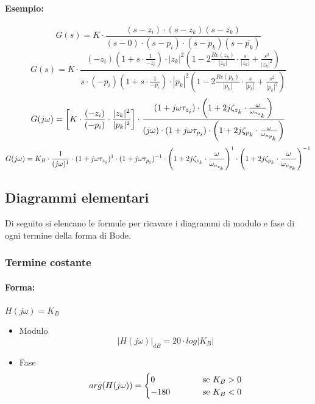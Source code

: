 \documentclass[a4paper]{article}
\begin{document}
	\paragraph{Esempio:}
	\[
	G(s) = K \cdot \frac{(s-z_i) \cdot (s-z_k)(s- \overline{z_k})}{(s-0) \cdot (s-p_i) \cdot (s-p_k)(s- \overline{p_k})}
	\]
	\[
	G(s) = K \cdot \frac{(-z_i) \left( 1+s \cdot \frac{1}{-z_i} \right) \cdot |z_k|^2 \left( 1-2\frac{Re(z_k)}{|z_k|} \cdot \frac{s}{|z_k|} + \frac{s^2}{|z_k|^2} \right) }{s \cdot (-p_i) \left( 1+s \cdot \frac{1}{-p_i} \right) \cdot |p_k|^2 \left( 1-2\frac{Re(p_k)}{|p_k|} \cdot \frac{s}{|p_k|} + \frac{s^2}{|p_k|^2} \right) }
	\]
	\[
	G(j\omega) = \left[ K \cdot \frac{(-z_i)}{(-p_i)} \cdot \frac{|z_k|^2}{|p_k|^2} \right] \cdot \frac{(1+j \omega \tau_{z \textsubscript{$i$}}) \cdot \left( 1+2j\zeta_{z \textsubscript{$k$}} \cdot \frac{\omega}{\omega_{n_{z \textsubscript{$k$}}}} \right) }{(j\omega) \cdot (1+j \omega \tau_{p \textsubscript{$i$}}) \cdot \left( 1+2j\zeta_{p \textsubscript{$k$}} \cdot \frac{\omega}{\omega_{n_{p \textsubscript{$k$}}}} \right) }
	\]
	\[
	G(j\omega) = K_B \cdot \frac{1}{(j\omega)^1} \cdot (1+j \omega \tau_{z \textsubscript{$i$}})^1 \cdot (1+j \omega \tau_{p \textsubscript{$i$}})^{-1} \cdot \left( 1+2j\zeta_{z \textsubscript{$k$}} \cdot \frac{\omega}{\omega_{n_{z \textsubscript{$k$}}}} \right)^1 \cdot \left( 1+2j\zeta_{p \textsubscript{$k$}} \cdot \frac{\omega}{\omega_{n_{p \textsubscript{$k$}}}} \right)^{-1}
	\]

	\subsection{Diagrammi elementari}
	Di seguito si elencano le formule per ricavare i diagrammi di modulo e fase di ogni termine della forma di Bode.
	
	\subsubsection{Termine costante}
	\paragraph{Forma:} $H(j\omega)=K_B$
	\begin{itemize}
		\item Modulo
			\[
			|H(j\omega)|_{dB} = 20 \cdot log|K_B|
			\]
		\item Fase
			\[
			arg(H(j\omega)) =
				\begin{cases}
				0& \hspace{1.0cm} \text{se } K_B > 0 \\
				-180& \hspace{1.0cm} \text{se } K_B < 0
				\end{cases}
			\]
	\end{itemize}
	
\end{document}
